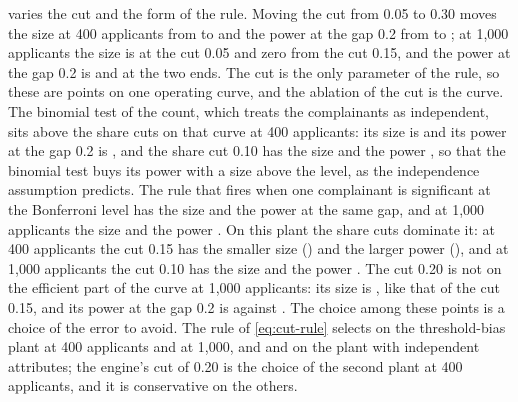  varies the cut and the form of the rule. Moving the cut from 0.05 to 0.30 moves the size at 400 applicants from \SiRateCutFiveSmallZ{} to \SiRateCutThirtySmallZ{} and the power at the gap 0.2 from \SiRateCutFiveSmallB{} to \SiRateCutThirtySmallB{}; at 1,000 applicants the size is \SiRateCutFiveLargeZ{} at the cut 0.05 and zero from the cut 0.15, and the power at the gap 0.2 is \SiRateCutFiveLargeB{} and \SiRateCutThirtyLargeB{} at the two ends. The cut is the only parameter of the rule, so these are points on one operating curve, and the ablation of the cut is the curve. The binomial test of the count, which treats the complainants as independent, sits above the share cuts on that curve at 400 applicants: its size is \SiRateCountBinSmallZ{} and its power at the gap 0.2 is \SiRateCountBinSmallB{}, and the share cut 0.10 has the size \SiRateCutTenSmallZ{} and the power \SiRateCutTenSmallB{}, so that the binomial test buys its power with a size above the level, as the independence assumption predicts. The rule that fires when one complainant is significant at the Bonferroni level has the size \SiRateBonfSmallZ{} and the power \SiRateBonfSmallB{} at the same gap, and at 1,000 applicants the size \SiRateBonfLargeZ{} and the power \SiRateBonfLargeB{}. On this plant the share cuts dominate it: at 400 applicants the cut 0.15 has the smaller size (\SiRateCutFifteenSmallZ{}) and the larger power (\SiRateCutFifteenSmallB{}), and at 1,000 applicants the cut 0.10 has the size \SiRateCutTenLargeZ{} and the power \SiRateCutTenLargeB{}. The cut 0.20 is not on the efficient part of the curve at 1,000 applicants: its size is \SiRateCutTwentyLargeZ{}, like that of the cut 0.15, and its power at the gap 0.2 is \SiRateCutTwentyLargeB{} against \SiRateCutFifteenLargeB{}. The choice among these points is a choice of the error to avoid. The rule of \cref{eq:cut-rule} selects \SiChosenThrSmall{} on the threshold-bias plant at 400 applicants and \SiChosenThrLarge{} at 1,000, and \SiChosenIndSmall{} and \SiChosenIndLarge{} on the plant with independent attributes; the engine's cut of 0.20 is the choice of the second plant at 400 applicants, and it is conservative on the others.
